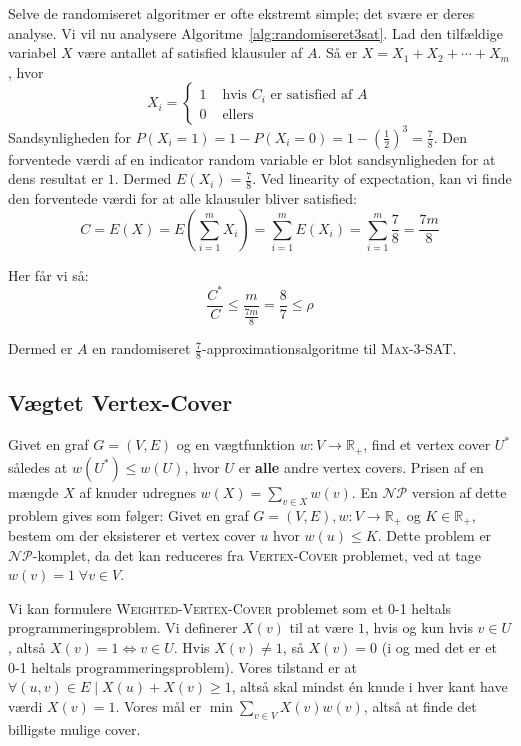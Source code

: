 Selve de randomiseret algoritmer er ofte ekstremt simple; det svære er deres analyse. Vi vil nu analysere Algoritme~\ref{alg:randomiseret3sat}. Lad den tilfældige variabel $X$ være antallet af satisfied klausuler af $A$. Så er $X = X_{1} + X_{2} + \cdots + X_{m}$, hvor
\begin{equation*}
	X_{i} = \begin{cases}
		1 & \text{ hvis }C_{i} \text{ er satisfied af }A \\
		0 & \text{ ellers}
	\end{cases}
\end{equation*}
Sandsynligheden for $P(X_i = 1) = 1 - P(X_{i} = 0) = 1 - (\frac{1}{2})^{3} = \frac{7}{8}$. Den forventede værdi af en indicator random variable er blot sandsynligheden for at dens resultat er $1$. Dermed $E(X_i) = \frac{7}{8}$. Ved linearity of expectation, kan vi finde den forventede værdi for at alle klausuler bliver satisfied:
\begin{equation*}
	C = E(X) = E(\sum_{i=1}^m X_{i}) = \sum_{i=1}^m E(X_{i}) = \sum_{i=1}^m \frac{7}{8} = \frac{7m}{8}
\end{equation*}

Her får vi så:
\begin{equation*}
	\frac{C^{*}}{C} \le \frac{m}{\frac{7m}{8}} = \frac{8}{7} \le \rho
\end{equation*}

Dermed er $A$ en randomiseret $\frac{7}{8}$-approximationsalgoritme til \textsc{Max-3-SAT}.

\subsection{Vægtet Vertex-Cover}%
\label{subsec:weightedvertexcover}

Givet en graf $G = (V,E)$ og en vægtfunktion $w : V \rightarrow \mathbb{R}_{+}$, find et vertex cover $U^{*}$ således at $w(U^{*}) \le w(U)$, hvor $U$ er \textbf{alle} andre vertex covers. Prisen af en mængde $X$ af knuder udregnes $w(X) = \sum_{v \in X} w(v)$. En $\mathcal{NP}$ version af dette problem gives som følger: Givet en graf $G = (V,E), w : V \rightarrow \mathbb{R}_{+}$ og $K \in \mathbb{R}_{+}$, bestem om der eksisterer et vertex cover $u$ hvor $w(u) \le K$. Dette problem er $\mathcal{NP}$-komplet, da det kan reduceres fra \textsc{Vertex-Cover} problemet, ved at tage $w(v) = 1\; \forall v \in V$.

Vi kan formulere \textsc{Weighted-Vertex-Cover} problemet som et 0-1 heltals programmeringsproblem. Vi definerer $X(v)$ til  at være $1$, hvis og kun hvis $v \in U$, altså $X(v) = 1 \iff v \in U$. Hvis $X(v) \ne 1$, så $X(v) = 0$ (i og med det er et 0-1 heltals programmeringsproblem). Vores tilstand er at $\forall (u,v) \in E \mid X(u) + X(v)  \ge 1 $, altså skal mindst én knude i hver kant have værdi $X(v) = 1$. Vores mål er $\min \sum_{v \in V} X(v) w(v) $, altså at finde det billigste mulige cover.

